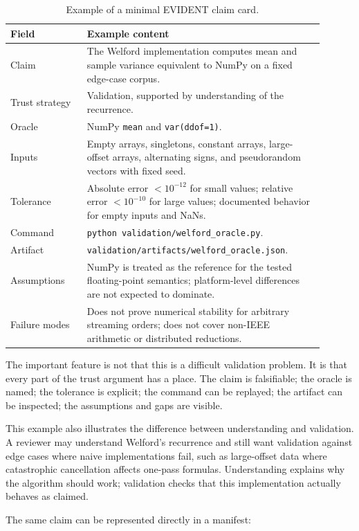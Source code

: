 \documentclass[10pt,twoside]{article}
\begin{document}
\begin{table}[h]
\centering
\caption{Example of a minimal EVIDENT claim card.}
\begin{tabular}{p{0.22\linewidth}p{0.68\linewidth}}
\toprule
Field & Example content \\
\midrule
Claim & The Welford implementation computes mean and sample variance equivalent
to NumPy on a fixed edge-case corpus. \\
Trust strategy & Validation, supported by understanding of the recurrence. \\
Oracle & NumPy \texttt{mean} and \texttt{var(ddof=1)}. \\
Inputs & Empty arrays, singletons, constant arrays, large-offset arrays,
alternating signs, and pseudorandom vectors with fixed seed. \\
Tolerance & Absolute error $<10^{-12}$ for small values; relative error
$<10^{-10}$ for large values; documented behavior for empty inputs and NaNs. \\
Command & \texttt{python validation/welford\_oracle.py}. \\
Artifact & \texttt{validation/artifacts/welford\_oracle.json}. \\
Assumptions & NumPy is treated as the reference for the tested floating-point
semantics; platform-level differences are not expected to dominate. \\
Failure modes & Does not prove numerical stability for arbitrary streaming
orders; does not cover non-IEEE arithmetic or distributed reductions. \\
\bottomrule
\end{tabular}
\end{table}

The important feature is not that this is a difficult validation problem. It is
that every part of the trust argument has a place. The claim is falsifiable; the
oracle is named; the tolerance is explicit; the command can be replayed; the
artifact can be inspected; the assumptions and gaps are visible.

This example also illustrates the difference between understanding and
validation. A reviewer may understand Welford's recurrence and still want
validation against edge cases where naive implementations fail, such as
large-offset data where catastrophic cancellation affects one-pass formulas.
Understanding explains why the algorithm should work; validation checks that
this implementation actually behaves as claimed.

The same claim can be represented directly in a manifest:
\end{document}
